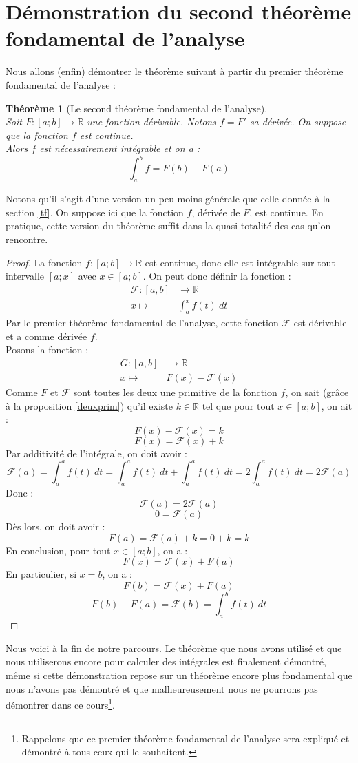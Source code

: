 \documentclass[a4paper,fontsize=13pt]{scrreprt}
\theoremstyle{plain}
\newtheorem{thé}[subsection]{Théorème}
\theoremstyle{definition}
\newcommand{\rr}{\mathbb{R}}
\begin{document}
\section{Démonstration du second théorème fondamental de l'analyse}

Nous allons (enfin) démontrer le théorème suivant à partir du premier théorème fondamental de l'analyse :
\begin{thé} [Le second théorème fondamental de l'analyse] ~\\
Soit $F : [a;b] \to \rr$ une fonction dérivable. Notons $f = F'$ sa dérivée. On suppose que la fonction $f$ est continue.\\
Alors $f$ est nécessairement intégrable et on a :
$$\int_{a}^{b} f = F(b) - F(a)$$
\end{thé}
Notons qu'il s'agit d'une version un peu moins générale que celle donnée à la section \ref{tf}. On suppose ici que la fonction $f$, dérivée de $F$, est continue. En pratique, cette version du théorème suffit dans la quasi totalité des cas qu'on rencontre.
\begin{proof}
La fonction $f : [a;b] \to \rr$ est continue, donc elle est intégrable sur tout intervalle $[a;x]$ avec $x \in [a;b]$. On peut donc définir la fonction :
\begin{align*}
\mathcal{F} : [a,b] &\to \rr \\
x \mapsto& \int_{a}^{x} f(t)~dt
\end{align*}
Par le premier théorème fondamental de l'analyse, cette fonction $\mathcal{F}$ est dérivable et a comme dérivée $f$. \\
Posons la fonction :
\begin{align*}
G : [a,b] &\to \rr \\
x \mapsto& F(x)-\mathcal{F}(x)
\end{align*}
Comme $F$ et $\mathcal{F}$ sont toutes les deux une primitive de la fonction $f$, on sait (grâce à la proposition \ref{deuxprim}) qu'il existe $k \in \rr$ tel que pour tout $x \in [a;b]$, on ait :
$$F(x)-\mathcal{F}(x) = k$$
$$F(x)=\mathcal{F}(x)+k$$
Par additivité de l'intégrale, on doit avoir :
$$\mathcal{F}(a) = \int_a^a f(t)~dt = \int_a^a f(t)~dt + \int_a^a f(t)~dt = 2 \int_a^a f(t)~dt = 2\mathcal{F}(a)$$
Donc :
$$\mathcal{F}(a)=2\mathcal{F}(a)$$
$$0=\mathcal{F}(a)$$
Dès lors, on doit avoir :
$$F(a)=\mathcal{F}(a)+k = 0+k = k$$
En conclusion, pour tout $x \in [a;b]$, on a :
$$F(x)=\mathcal{F}(x)+F(a)$$
En particulier, si $x=b$, on a :
$$F(b)=\mathcal{F}(x)+F(a)$$
$$F(b)-F(a)=\mathcal{F}(b)=\int_{a}^{b} f(t)~dt$$
\end{proof}
Nous voici à la fin de notre parcours. Le théorème que nous avons utilisé et que nous utiliserons encore pour calculer des intégrales est finalement démontré, même si cette démonstration repose sur un théorème encore plus fondamental que nous n'avons pas démontré et que malheureusement nous ne pourrons pas démontrer dans ce cours\footnote{Rappelons que ce premier théorème fondamental de l'analyse sera expliqué et démontré à tous ceux qui le souhaitent.}.
\end{document}
